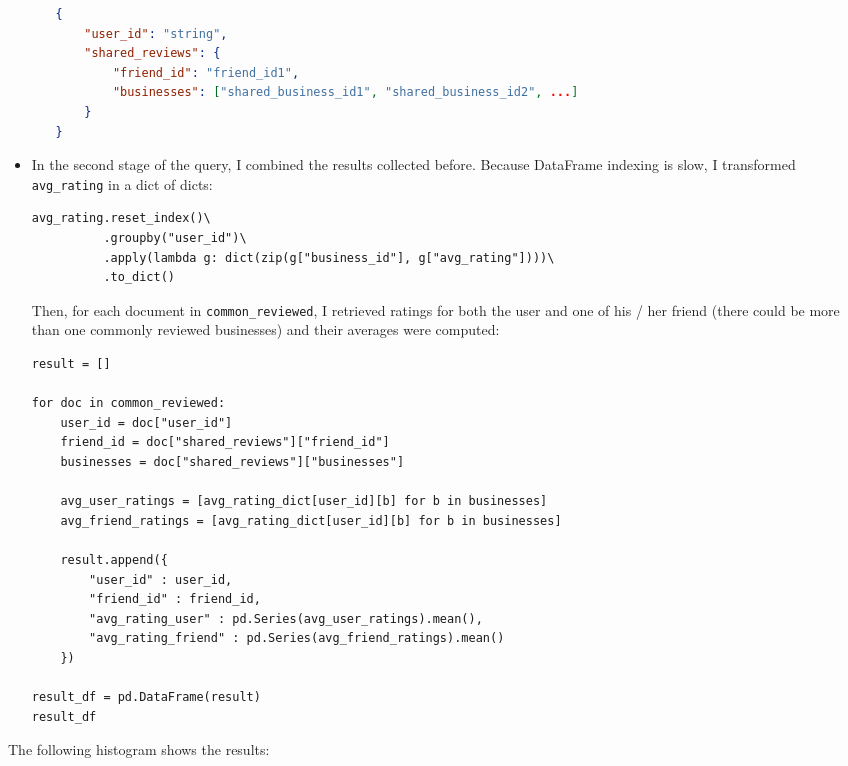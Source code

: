 \documentclass{Configuration_Files/PoliMi3i_thesis}
\begin{document}
\begin{itemize}
\begin{itemize}
\begin{lstlisting}[language=json]
{
    "user_id": "string",
    "shared_reviews": {
        "friend_id": "friend_id1",
        "businesses": ["shared_business_id1", "shared_business_id2", ...]
    }
}
\end{lstlisting}
\end{itemize}

\bigskip

\item In the second stage of the query, I combined the results collected before. Because DataFrame indexing is slow, I transformed \texttt{avg\_rating} in a dict of dicts:

\bigskip 

\begin{verbatim}
avg_rating.reset_index()\
          .groupby("user_id")\
          .apply(lambda g: dict(zip(g["business_id"], g["avg_rating"])))\
          .to_dict()
\end{verbatim}

\bigskip

Then, for each document in \texttt{common\_reviewed}, I retrieved ratings for both the user and one of his / her friend (there could be more than one commonly reviewed businesses) and their averages were computed: 

\bigskip 

\begin{verbatim}
result = []

for doc in common_reviewed:
    user_id = doc["user_id"]
    friend_id = doc["shared_reviews"]["friend_id"]
    businesses = doc["shared_reviews"]["businesses"]
    
    avg_user_ratings = [avg_rating_dict[user_id][b] for b in businesses]
    avg_friend_ratings = [avg_rating_dict[user_id][b] for b in businesses]
    
    result.append({
        "user_id" : user_id,
        "friend_id" : friend_id,
        "avg_rating_user" : pd.Series(avg_user_ratings).mean(),
        "avg_rating_friend" : pd.Series(avg_friend_ratings).mean()
    })
    
result_df = pd.DataFrame(result)
result_df
\end{verbatim}

\bigskip

\end{itemize}

The following histogram shows the results:

\bigskip
\end{document}
